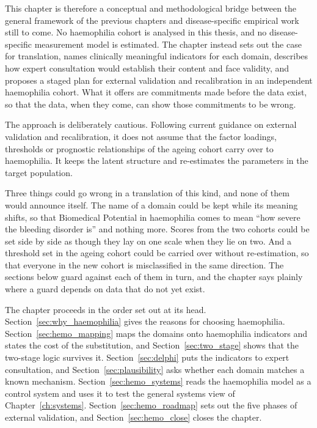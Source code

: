 This chapter is therefore a conceptual and methodological bridge between the general framework of the previous chapters and disease-specific empirical work still to come. No haemophilia cohort is analysed in this thesis, and no disease-specific measurement model is estimated. The chapter instead sets out the case for translation, names clinically meaningful indicators for each domain, describes how expert consultation would establish their content and face validity, and proposes a staged plan for external validation and recalibration in an independent haemophilia cohort. What it offers are commitments made before the data exist, so that the data, when they come, can show those commitments to be wrong.

The approach is deliberately cautious. Following current guidance on external validation and recalibration, it does not assume that the factor loadings, thresholds or prognostic relationships of the ageing cohort carry over to haemophilia. It keeps the latent structure and re-estimates the parameters in the target population.

Three things could go wrong in a translation of this kind, and none of them would announce itself. The name of a domain could be kept while its meaning shifts, so that Biomedical Potential in haemophilia comes to mean ``how severe the bleeding disorder is'' and nothing more. Scores from the two cohorts could be set side by side as though they lay on one scale when they lie on two. And a threshold set in the ageing cohort could be carried over without re-estimation, so that everyone in the new cohort is misclassified in the same direction. The sections below guard against each of them in turn, and the chapter says plainly where a guard depends on data that do not yet exist.

The chapter proceeds in the order set out at its head. Section~\ref{sec:why_haemophilia} gives the reasons for choosing haemophilia. Section~\ref{sec:hemo_mapping} maps the domains onto haemophilia indicators and states the cost of the substitution, and Section~\ref{sec:two_stage} shows that the two-stage logic survives it. Section~\ref{sec:delphi} puts the indicators to expert consultation, and Section~\ref{sec:plausibility} asks whether each domain matches a known mechanism. Section~\ref{sec:hemo_systems} reads the haemophilia model as a control system and uses it to test the general systems view of Chapter~\ref{ch:systems}. Section~\ref{sec:hemo_roadmap} sets out the five phases of external validation, and Section~\ref{sec:hemo_close} closes the chapter.

